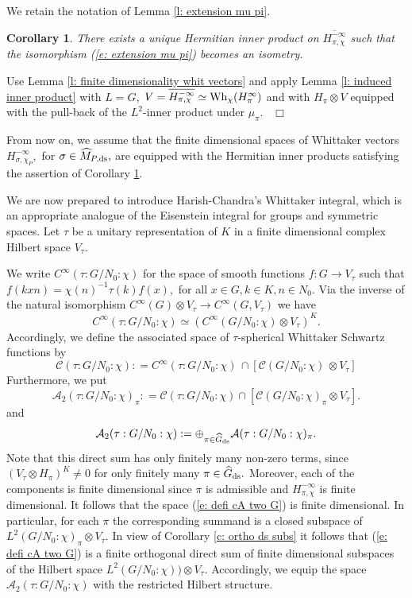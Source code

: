 \documentclass[12pt,a4paper]{article}
\newtheorem{Cor}[Thm]{Corollary}
\newenvironment{cor}[0]{\begin{Cor}\noindent}%
{\end{Cor}}
\def\proof{\par\noindent{\it Proof.}{\ }{\ }}
\def\qed{~\hfill\hbox{$\Box$}\medbreak}
\def\gs{\sigma}
\def\to{\rightarrow}
\def\cA{{\mathcal A}}
\def\cC{{\mathcal C}}
\numberwithin{Thm}{section}
\numberwithin{equation}{section}
\def\Vtau{V_\tau}
\def\Wh{{\rm Wh}}
\numberwithin{equation}{section}
\def\MPds{\widehat M_{P,\rm ds}}
\begin{document}
We retain the notation of  Lemma \ref{l: extension mu pi}.

\begin{cor}
\label{c: mu pi isometric}
There exists a unique Hermitian inner product on $\overline{H_{\pi, \chi}^{-\infty}}$ 
such that the isomorphism (\ref{e: extension mu pi}) becomes an isometry.
\end{cor} 

\proof 
Use Lemma \ref{l: finite dimensionality whit vectors} and apply Lemma \ref{l: induced inner product} with $L= G,$ $V = \overline{H^{-\infty}_{\pi, \chi}} \simeq \Wh_\chi(H_\pi^\infty)$ 
and with $H_\pi \otimes V$ equipped with the pull-back
of the $L^2$-inner product under $\mu_\pi.$
\qed

From now on, we assume that the finite dimensional spaces of Whittaker vectors
$H_{\gs, \chi_P}^{-\infty},$ for $\gs \in \MPds,$ are equipped with the Hermitian inner products satisfying the assertion of Corollary \ref{c: mu pi isometric}. 

We are now prepared to introduce Harish-Chandra's  Whittaker integral, which is an 
appropriate analogue of the Eisenstein integral for groups and symmetric spaces.
Let $\tau$ be a unitary representation of $K$ in a finite dimensional complex Hilbert space $V_\tau.$ 

We write $C^\infty(\tau: G/N_0 : \chi)$ for the space of smooth functions
$f: G\to V_\tau$ such that $f(k x n) = \chi(n)^{-1} \tau(k) f(x),$ for all $x \in G, k\in K, n\in N_0.$ 
Via the inverse of the natural isomorphism $C^\infty(G)\otimes V_\tau \to C^\infty(G, V_\tau)$ we have
$$ 
C^\infty(\tau: G/N_0 : \chi) \simeq (C^\infty(G/N_0:\chi) \otimes V_\tau)^K.
$$ 
Accordingly, we define the associated space of $\tau$-spherical Whittaker Schwartz functions by 
$$ 
\cC(\tau: G/N_0: \chi) : = C^\infty(\tau: G/N_0: \chi) \,\cap [\cC(G/N_0: \chi)\, \otimes \Vtau]
$$ 
Furthermore, we put 
$$ 
\cA_2(\tau: G/N_0:\chi)_\pi: = \cC(\tau: G/N_0: \chi) \cap [\cC(G/N_0: \chi)_\pi \otimes \Vtau].
$$ 
and   
\begin{equation}
\label{e: defi cA two G}
 \cA_2(\tau: G /N_0: \chi):= \oplus_{\pi\in \widehat G_{\rm ds}} \cA(\tau : G/N_0: \chi)_\pi.
\end{equation}
Note that this direct sum has only finitely many non-zero terms, since 
$(V_\tau \otimes H_\pi)^K \neq 0$ for only finitely many $\pi \in \widehat G_{\rm ds}.$ 
Moreover, each of the components is finite dimensional since $\pi$ is admissible and
$H_{\pi,\chi}^{-\infty}$ is finite dimensional. It follows that the space
(\ref{e: defi cA two G}) is finite dimensional. In particular, for each $\pi$ the corresponding 
summand is a closed
subspace of $L^2(G/N_0: \chi)_\pi \otimes \Vtau$. In view of Corollary \ref{c: ortho ds subs} 
it follows that (\ref{e: defi cA two G}) is a finite orthogonal direct sum of finite dimensional
subspaces of the Hilbert space $L^2(G/N_0: \chi)) \otimes \Vtau.$ 
Accordingly, we equip the space $\cA_2(\tau: G /N_0: \chi) $ with the restricted
Hilbert structure.
\end{document}
